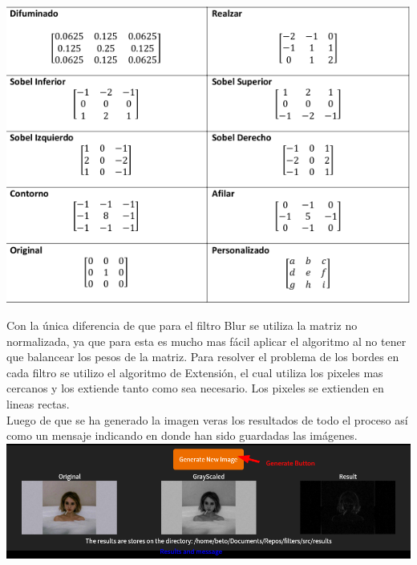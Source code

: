 \documentclass[12pt]{article}
\begin{document}
\includegraphics[width=\textwidth]{kernels}

Con la única diferencia de que para el filtro Blur se utiliza la matriz no normalizada, ya que para esta es mucho
 mas fácil aplicar el algoritmo al no tener que balancear los pesos de la matriz. Para resolver el problema de los
 bordes en cada filtro se utilizo el algoritmo de Extensión, el cual utiliza los pixeles mas cercanos y los
 extiende tanto como sea necesario. Los pixeles se extienden en lineas rectas. \\

Luego de que se ha generado la imagen veras los resultados de todo el proceso así como un mensaje indicando en donde
 han sido guardadas las imágenes. \\

\includegraphics[width=\textwidth]{results}
\end{document}
